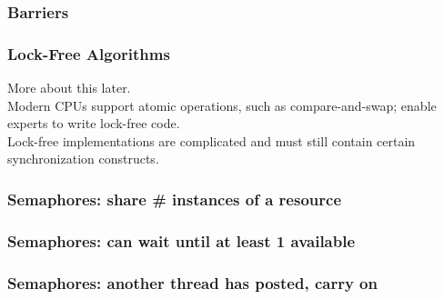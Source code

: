 \begin{frame}
  \frametitle{Barriers}

  \begin{center}
    
  \end{center}

\end{frame}

\begin{frame}
  \frametitle{Lock-Free Algorithms}


    More about this later.\\[1em]

    Modern CPUs support atomic operations, such as compare-and-swap;
enable experts to write lock-free code.\\[1em]

    Lock-free implementations are complicated and must still contain certain synchronization constructs.

\end{frame}

\begin{frame}
  \frametitle{Semaphores: share \# instances of a resource}

  \begin{center}
    
  \end{center}

\end{frame}

\begin{frame}
  \frametitle{Semaphores: can wait until at least 1 available}

  \begin{center}
    
  \end{center}

\end{frame}

\begin{frame}
  \frametitle{Semaphores: another thread has posted, carry on}

  \begin{center}
    
  \end{center}

\end{frame}



